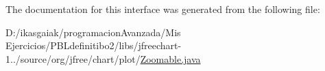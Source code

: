 The documentation for this interface was generated from the following file\+:\begin{DoxyCompactItemize}
\item 
D\+:/ikasgaiak/programacion\+Avanzada/\+Mis Ejercicios/\+P\+B\+Ldefinitibo2/libs/jfreechart-\/1../source/org/jfree/chart/plot/\mbox{\hyperlink{_zoomable_8java}{Zoomable.\+java}}\end{DoxyCompactItemize}
